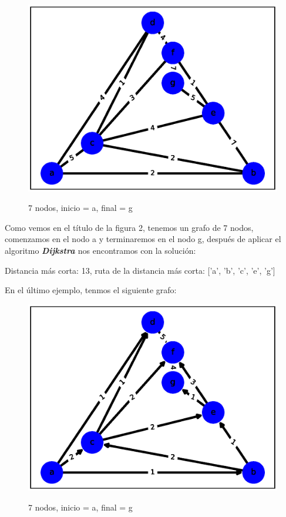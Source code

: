 \documentclass{report}
\newcommand{\dij}{{\bfseries {\textit{Dijkstra }}}}
\begin{document}
\begin{figure}[h!t]
    \centering
    \includegraphics[scale = 0.35]{ejemplo2.eps}
    \label{figura2}
    \caption{7 nodos, inicio = a, final = g}
\end{figure}

Como vemos en el título de la  figura 2, tenemos un grafo de 7 nodos, comenzamos en el nodo a y terminaremos en el nodo g, después de aplicar el algoritmo  \dij nos encontramos con la solución:
\begin{center}
    Distancia más corta:
    13,
    ruta de la distancia más corta:
    ['a', 'b', 'c', 'e', 'g']
\end{center}

En el último ejemplo, tenmos el siguiente grafo:

\begin{figure}[h!t]
    \centering
    \includegraphics[scale = 0.4]{ejemplo3.eps}
    \label{figura3}
    \caption{7 nodos, inicio = a, final = g}
\end{figure}
\end{document}
